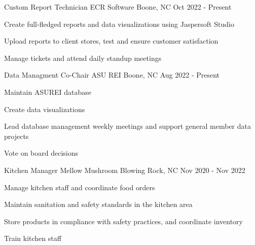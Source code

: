 

\begin{cventries}

  \cventry
    {Custom Report Technician} %
    {ECR Software} %
    {Boone, NC} %
    {Oct 2022 - Present} %
    {
      \begin{cvitems} %
        \item {Create full-fledged reports and data visualizations using Jaspersoft Studio}
        \item {Upload reports to client stores, test and ensure customer satisfaction}
        \item {Manage tickets and attend daily standup meetings}
      \end{cvitems}
    }

  \cventry
    {Data Managment Co-Chair} %
    {ASU REI} %
    {Boone, NC} %
    {Aug 2022 - Present} %
    {
      \begin{cvitems} %
        \item {Maintain ASUREI database}
        \item {Create data visualizations}
        \item {Lead database management weekly meetings and support general member data projects}
        \item {Vote on board decisions}
      \end{cvitems}
    }

\cventry
{Kitchen Manager} %
{Mellow Mushroom} %
{Blowing Rock, NC} %
{Nov 2020 - Nov 2022} %
{
  \begin{cvitems} %
    \item {Manage kitchen staff and coordinate food orders}
    \item {Maintain sanitation and safety standards in the kitchen area}
    \item {Store products in compliance with safety practices, and coordinate inventory}
    \item {Train kitchen staff}
  \end{cvitems}
}


\end{cventries}
